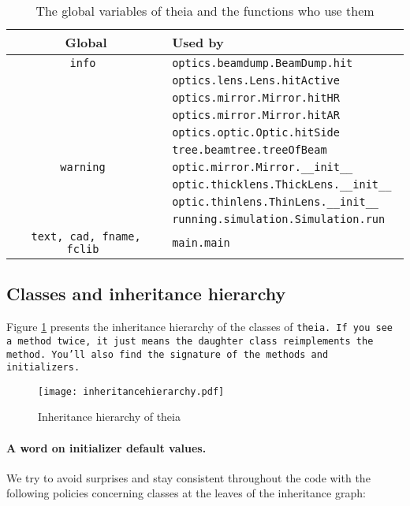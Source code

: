 \documentclass{article}
\begin{document}
\begin{table}[h]
\begin{center}

\begin{tabular}{|c | l |}
\hline
\textbf{Global} & \textbf{Used by} \\ \hline \hline

\tt{info} & \tt{optics.beamdump.BeamDump.hit} \\
& \tt{optics.lens.Lens.hitActive} \\
& \tt{optics.mirror.Mirror.hitHR} \\
& \tt{optics.mirror.Mirror.hitAR} \\
& \tt{optics.optic.Optic.hitSide} \\
& \tt{tree.beamtree.treeOfBeam} \\ \hline

\tt{warning} & \tt{optic.mirror.Mirror.\_\_init\_\_} \\
& \tt{optic.thicklens.ThickLens.\_\_init\_\_} \\
& \tt{optic.thinlens.ThinLens.\_\_init\_\_} \\
& \tt{running.simulation.Simulation.run} \\ \hline

\tt{text, cad, fname, fclib} & \tt{main.main} \\ \hline

\end{tabular}
\caption{The global variables of theia and the functions who use them}
\label{globals}
\end{center}
\end{table}
\subsection{Classes and inheritance hierarchy}
Figure \ref{inheritancehierarchy} presents the inheritance hierarchy of the classes of \tt{theia}. If you see a method twice, it just means the daughter class reimplements the method. You'll also find the signature of the methods and  initializers.

\begin{figure}[h]
\begin{center}
\texttt{[image: inheritancehierarchy.pdf]}
\caption{Inheritance hierarchy of theia}
\label{inheritancehierarchy}
\end{center}
\end{figure}
\paragraph{A word on initializer default values.}We try to avoid surprises and stay consistent throughout the code with the following policies concerning classes at the leaves of the inheritance graph:
\end{document}
